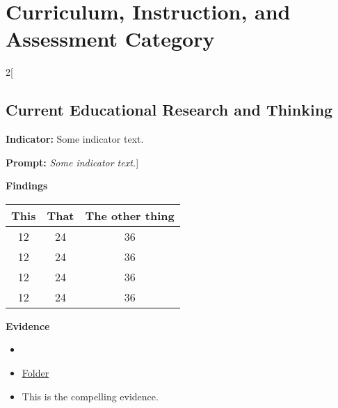 \documentclass{report}
\begin{document}
\section{ Curriculum, Instruction, and Assessment Category}
\blindtext

\blindtext
 
\begin{paracol}{2}[\subsection{Current Educational Research and Thinking}
\noindent\textbf{Indicator:} Some indicator text.

\noindent\textbf{Prompt:} \textit{Some indicator text.}]

\noindent\textbf{Findings}

\blindtext

\begin{table}[!h]
\begin{tabular}{c | c || c}
This & That & The other thing \\
\hline
12   &  24  &  36 \\
12   &  24  &  36 \\
12   &  24  &  36 \\
12   &  24  &  36 \\
\end{tabular}
\end{table}


\blindtext

\switchcolumn
\noindent\textbf{Evidence}
\vspace{-\topsep}

\begin{itemize}[leftmargin=*]
\setlength{\parskip}{0pt}
\setlength{\itemsep}{0pt plus 1pt}
\item \blindtext
\item \href{https://drive.google.com/a/cmis.ac.th/folderview?id=0ByVFfrm0zfolWE0yenprdktGVlk&usp=sharing}{Folder}
\item This is the compelling evidence.
\end{itemize}

\end{paracol}
\end{document}
